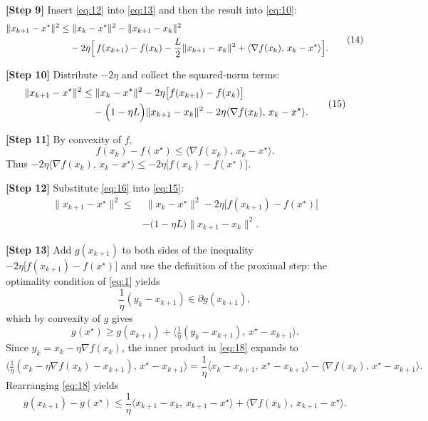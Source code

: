 \documentclass{article}
\begin{document}
\noindent\textbf{[Step 9]} Insert \eqref{eq:12} into \eqref{eq:13} and then the result into \eqref{eq:10}:
\[
\begin{aligned}
\|x_{k+1}-x^{\star}\|^{2}
\le &\; \|x_{k}-x^{\star}\|^{2}
-\|x_{k+1}-x_{k}\|^{2} \\
&-2\eta\Bigl[\,f(x_{k+1})-f(x_{k})-\frac{L}{2}\|x_{k+1}-x_{k}\|^{2}
+\langle\nabla f(x_{k}),\,x_{k}-x^{\star}\rangle\Bigr].
\end{aligned}
\tag{14}
\]

\noindent\textbf{[Step 10]} Distribute $-2\eta$ and collect the squared‑norm terms:
\[
\begin{aligned}
\|x_{k+1}-x^{\star}\|^{2}
\le &\; \|x_{k}-x^{\star}\|^{2}
-2\eta\bigl[f(x_{k+1})-f(x_{k})\bigr] \\
&-\Bigl(1-\eta L\Bigr)\|x_{k+1}-x_{k}\|^{2}
-2\eta\langle\nabla f(x_{k}),\,x_{k}-x^{\star}\rangle .
\end{aligned}
\tag{15}
\]

\noindent\textbf{[Step 11]} By convexity of $f$,
\[
f(x_{k})-f(x^{\star})\le\langle\nabla f(x_{k}),\,x_{k}-x^{\star}\rangle .
\tag{16}
\]
Thus $-2\eta\langle\nabla f(x_{k}),\,x_{k}-x^{\star}\rangle\le-2\eta\bigl[f(x_{k})-f(x^{\star})\bigr]$.

\noindent\textbf{[Step 12]} Substitute \eqref{eq:16} into \eqref{eq:15}:
\[
\begin{aligned}
\|x_{k+1}-x^{\star}\|^{2}
\le &\; \|x_{k}-x^{\star}\|^{2}
-2\eta\bigl[f(x_{k+1})-f(x^{\star})\bigr] \\
&-\bigl(1-\eta L\bigr)\|x_{k+1}-x_{k}\|^{2}.
\end{aligned}
\tag{17}
\]

\noindent\textbf{[Step 13]} Add $g(x_{k+1})$ to both sides of the inequality $-2\eta\bigl[f(x_{k+1})-f(x^{\star})\bigr]$ and use the definition of the proximal step:
the optimality condition of \eqref{eq:1} yields
\[
\frac{1}{\eta}(y_{k}-x_{k+1})\in\partial g(x_{k+1}),
\]
which by convexity of $g$ gives
\[
g(x^{\star})\ge g(x_{k+1})+\langle\tfrac{1}{\eta}(y_{k}-x_{k+1}),\,x^{\star}-x_{k+1}\rangle .
\tag{18}
\]
Since $y_{k}=x_{k}-\eta\nabla f(x_{k})$, the inner product in \eqref{eq:18} expands to
\[
\langle\tfrac{1}{\eta}(x_{k}-\eta\nabla f(x_{k})-x_{k+1}),\,x^{\star}-x_{k+1}\rangle
= \frac{1}{\eta}\langle x_{k}-x_{k+1},\,x^{\star}-x_{k+1}\rangle
-\langle\nabla f(x_{k}),\,x^{\star}-x_{k+1}\rangle .
\]
Rearranging \eqref{eq:18} yields
\[
g(x_{k+1})-g(x^{\star})
\le \frac{1}{\eta}\langle x_{k+1}-x_{k},\,x_{k+1}-x^{\star}\rangle
+\langle\nabla f(x_{k}),\,x_{k+1}-x^{\star}\rangle .
\tag{19}
\]
\end{document}
